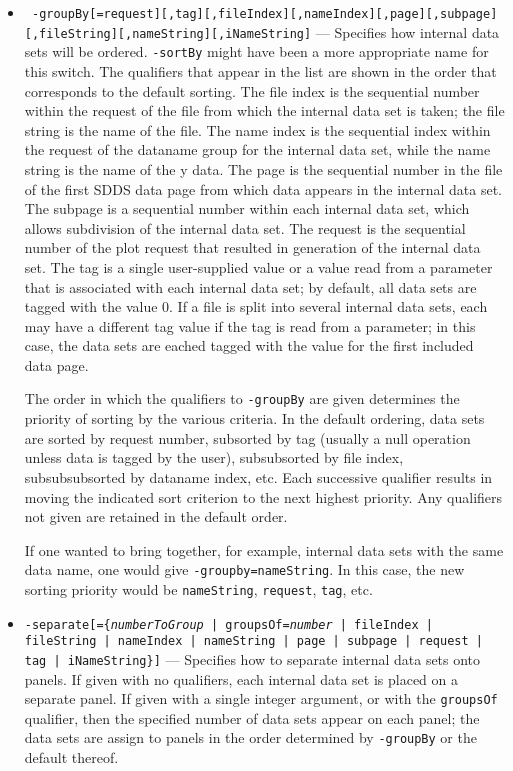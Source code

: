 \begin{itemize}
\begin{itemize}
\begin{itemize}
  \item {\tt
 -groupBy[=request][,tag][,fileIndex][,nameIndex][,page][,subpage]} {\tt [,fileString][,nameString][,iNameString]} ---
 Specifies how internal data sets will be ordered.  {\tt -sortBy} might have been a more appropriate
 name for this switch.  The qualifiers that appear in the list are shown in the order that
 corresponds to the default sorting.  The file index is the sequential number within the request of
 the file from which the internal data set is taken; the file string is the name of the file.  The
 name index is the sequential index within the request of the dataname group for the internal data
 set, while the name string is the name of the y data.  The page is the sequential number in the file
 of the first SDDS data page from which data appears in the internal data set.  The subpage is a
 sequential number within each internal data set, which allows subdivision of the internal data set.
 The request is the sequential number of the plot request that resulted in generation of the internal
 data set.  The tag is a single user-supplied value or a value read from a parameter that is
 associated with each internal data set; by default, all data sets are tagged with the value 0.  If a
 file is split into several internal data sets, each may have a different tag value if the tag is
 read from a parameter; in this case, the data sets are eached tagged with the value for the first
 included data page.

The order in which the qualifiers to {\tt -groupBy} are given determines the priority of sorting by
the various criteria.  In the default ordering, data sets are sorted by request number, subsorted by
tag (usually a null operation unless data is tagged by the user), subsubsorted by file index,
subsubsubsorted by dataname index, etc.  Each successive qualifier results in moving the indicated
sort criterion to the next highest priority.  Any qualifiers not given are retained in the default
order.

If one wanted to bring together, for example, internal data sets with the same data name, one would
give {\tt -groupby=nameString}.  In this case, the new sorting priority would be {\tt nameString},
{\tt request}, {\tt tag}, etc.

  \item {\tt -separate[=\{{\em numberToGroup} | groupsOf={\em number} | fileIndex | fileString |
nameIndex | nameString | page | subpage | request | tag | iNameString\}]} --- Specifies how to separate internal data
sets onto panels.  If given with no qualifiers, each internal data set is placed on a separate panel.
If given with a single integer argument, or with the {\tt groupsOf} qualifier, then the specified
number of data sets appear on each panel; the data sets are assign to panels in the order determined
by {\tt -groupBy} or the default thereof.


\end{itemize}
\end{itemize}
\end{itemize}
